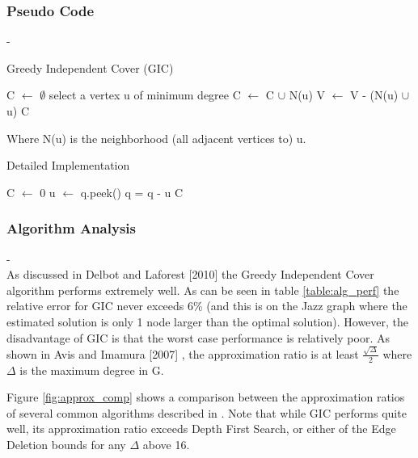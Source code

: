 \documentclass[acmlarge]{acmart}
\begin{document}
\subsubsection{Pseudo Code}

-\\

\begin{algorithm}[H]
	\caption{Greedy Independent Cover (GIC)}
	\SetAlgoLined
	C $\leftarrow$ $\emptyset$\;
	{
		select a vertex u of minimum degree\;
		C $\leftarrow$ C $\cup$ N(u)\;
		V $\leftarrow$ V - (N(u) $\cup$ {u})\;
	}
	\Return C\;
\end{algorithm}

Where N(u) is the neighborhood (all adjacent vertices to) u.\\

\begin{algorithm}[H]
	\caption{Detailed Implementation}
	\SetAlgoLined
	C $\leftarrow$ 0\;
	{
		u $\leftarrow$ q.peek()\;
		q = q - u\;
	}
	\Return C\;
\end{algorithm}

\subsubsection{Algorithm Analysis}\label{app_alg_analy}

-\\

As discussed in Delbot and Laforest [2010] \cite{Fran10} the Greedy Independent Cover algorithm performs extremely well. As can be seen in table \ref{table:alg_perf} the relative error for GIC never exceeds 6\% (and this is on the Jazz graph where the estimated solution is only 1 node larger than the optimal solution). However, the disadvantage of GIC is that the worst case performance is relatively poor. As shown in Avis and Imamura [2007] \cite{Avis06}, the approximation ratio is at least $\frac{\sqrt{\Delta}}{2}$ where $\Delta$ is the maximum degree in G.

Figure \ref{fig:approx_comp} shows a comparison between the approximation ratios of several common algorithms described in \cite{Fran10}. Note that while GIC performs quite well, its approximation ratio exceeds Depth First Search, or either of the Edge Deletion bounds for any $\Delta$ above 16.
\end{document}
